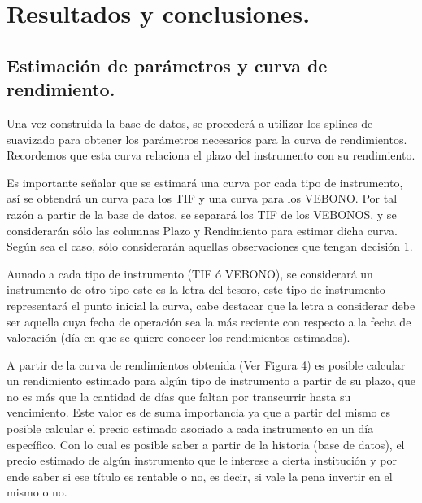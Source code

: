 \chapter{Resultados y conclusiones.}




\section{Estimaci\'on de par\'ametros y curva de rendimiento.}

\hspace{0.4cm} Una vez construida la base de datos, se proceder\'a a utilizar los splines de suavizado para obtener los par\'ametros necesarios para la curva de rendimientos. Recordemos que esta curva relaciona el plazo del instrumento con su rendimiento.


\hspace{0.4cm} Es importante se\~nalar que se estimar\'a una curva por cada tipo de instrumento, as\'i se obtendr\'a un curva para los TIF y una curva para los VEBONO. Por tal raz\'on a partir de la base de datos, se separar\'a los TIF de los VEBONOS, y se considerar\'an s\'olo las columnas Plazo y Rendimiento para estimar dicha curva. Seg\'un sea el caso, s\'olo considerar\'an aquellas observaciones que tengan decisi\'on 1.


\hspace{0.4cm} Aunado a cada tipo de instrumento (TIF \'o VEBONO), se considerar\'a un instrumento de otro tipo este es la letra del tesoro, este tipo de instrumento representar\'a el punto inicial la curva, cabe destacar que la letra a considerar debe ser aquella cuya fecha de operaci\'on sea la m\'as reciente con respecto a la fecha de valoraci\'on (d\'ia en que se quiere conocer los rendimientos estimados).


\hspace{0.4cm} A partir de la curva de rendimientos obtenida (Ver Figura 4) es posible calcular un rendimiento estimado para alg\'un tipo de instrumento a partir de su plazo, que no es m\'as que la cantidad de d\'ias que faltan por transcurrir hasta su vencimiento. Este valor es de suma importancia ya que a partir del mismo es posible calcular el precio estimado asociado a cada instrumento en un d\'ia espec\'ifico. Con lo cual es posible saber a partir de la historia (base de datos), el precio estimado de alg\'un instrumento que le interese a cierta instituci\'on y por ende saber si ese t\'itulo es rentable o no, es decir, si vale la pena invertir en el mismo o no.\\

